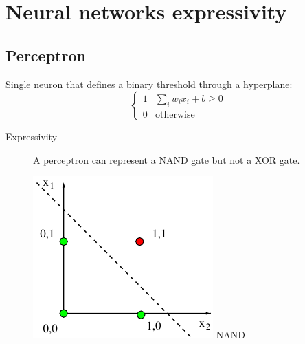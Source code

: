 \chapter{Neural networks expressivity}



\section{Perceptron}

Single neuron that defines a binary threshold through a hyperplane:
\[
    \begin{cases}
        1 & \sum_{i} w_i x_i + b \geq 0 \\
        0 & \text{otherwise}
    \end{cases}    
\]

\begin{description}
    \item[Expressivity] 
        A perceptron can represent a NAND gate but not a XOR gate.
        \begin{center}
            \begin{minipage}{.2\textwidth}
                \centering
                \includegraphics[width=\textwidth]{img/_perceptron_nand.pdf}
                \tiny NAND
            \end{minipage}
            \begin{minipage}{.2\textwidth}

\end{minipage}
\end{center}
\end{description}
